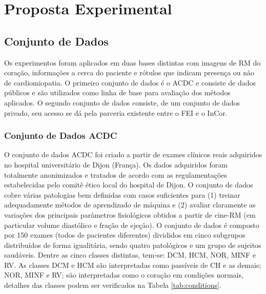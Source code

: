 \chapter{Proposta Experimental}
\label{chap:proposta}

\section{Conjunto de Dados} 
\label{sec:cap5_conj_dados}

Os experimentos foram  aplicados em duas bases distintas com imagens de RM do coração, informações a cerca do paciente e rótulos que indicam presença ou não de cardiomiopatia. O primeiro conjunto de dados é o ACDC e consiste de dados públicos e são utilizados como linha de base para avaliação dos métodos aplicados. O segundo conjunto de dados consiste, de um conjunto de dados privado, seu acesso
se dá pela parceria existente entre o \gls{FEI} e o \gls{InCor}.

\subsection{Conjunto de Dados ACDC} 
\label{subsec:cap5_acdc}

O conjunto de dados \gls{ACDC} foi criado a partir de exames clínicos reais adquiridos no hospital universitário de Dijon (França). Os dados adquiridos foram totalmente anonimizados e tratados de acordo com as regulamentações estabelecidas pelo comitê ético local do hospital de Dijon. O conjunto de dados cobre várias patologias bem definidas com casos suficientes para (1) treinar adequadamente métodos de aprendizado de máquina e (2) avaliar claramente as variações dos principais parâmetros fisiológicos obtidos a partir de cine-RM (em particular volume diastólico e fração de ejeção). O conjunto de dados é composto por 150 exames (todos de pacientes diferentes) divididos em cinco subgrupos distribuídos de forma igualitária, sendo quatro patológicos e um grupo de sujeitos saudáveis. Dentre as cinco classes distintas, tem-se: \gls{DCM}, \gls{HCM}, \gls{NOR}, \gls{MINF} e \gls{RV}. As classes DCM e HCM são interpretadas como passíveis de \gls{CH} e as demais; NOR, MINF e RV; são interpretadas como o coração em condições normais, detalhes das classes podem ser verificados na Tabela \ref{tab:conditions}. 

